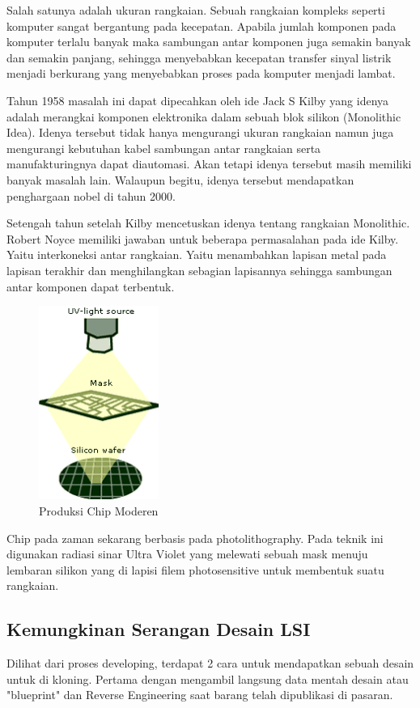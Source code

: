 Salah satunya adalah ukuran rangkaian. Sebuah rangkaian kompleks seperti komputer sangat bergantung pada kecepatan. Apabila jumlah komponen pada komputer terlalu banyak maka sambungan antar komponen juga semakin banyak dan semakin panjang, sehingga menyebabkan kecepatan transfer sinyal listrik menjadi berkurang yang menyebabkan proses pada komputer menjadi lambat.

Tahun 1958 masalah ini dapat dipecahkan oleh ide Jack S Kilby yang idenya adalah merangkai komponen elektronika dalam sebuah blok silikon (Monolithic Idea). Idenya tersebut tidak hanya mengurangi ukuran rangkaian namun juga mengurangi kebutuhan kabel sambungan antar rangkaian serta manufakturingnya dapat diautomasi. Akan tetapi idenya tersebut masih memiliki banyak masalah lain. Walaupun begitu, idenya tersebut mendapatkan penghargaan nobel di tahun 2000.

Setengah tahun setelah Kilby mencetuskan idenya tentang rangkaian Monolithic. Robert Noyce memiliki jawaban untuk beberapa permasalahan pada ide Kilby. Yaitu interkoneksi antar rangkaian. Yaitu menambahkan lapisan metal pada lapisan terakhir dan menghilangkan sebagian lapisannya sehingga sambungan antar komponen dapat terbentuk.

\begin{figure}
	\centering
	\includegraphics[width=0.35\textwidth]
	{pics/steping.png}
	\caption{Produksi Chip Moderen}
	\label{fig:produksiChipModeren}
\end{figure}

Chip pada zaman sekarang berbasis pada photolithography. Pada teknik ini digunakan radiasi sinar Ultra Violet yang melewati sebuah mask menuju lembaran silikon yang di lapisi filem photosensitive untuk membentuk suatu rangkaian.

\subsection{Kemungkinan Serangan Desain LSI}
Dilihat dari proses developing, terdapat 2 cara untuk mendapatkan sebuah desain untuk di kloning. Pertama dengan mengambil langsung data mentah desain atau "blueprint" dan Reverse Engineering saat barang telah dipublikasi di pasaran.


